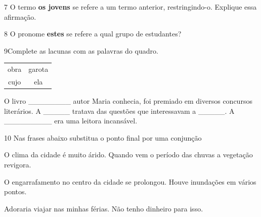 \num{7} O termo \textbf{os jovens} se refere a um termo anterior, restringindo-o. 
Explique essa afirmação.


\num{8} O pronome \textbf{estes} se refere a qual grupo de estudantes?


\num{9}Complete as lacunas com as palavras do quadro.

\begin{table}[h!]
\begin{tabular}{cc}
obra & garota \\
cujo & ela
\end{tabular}
\end{table}

O livro \_\_\_\_\_\_\_\_ autor Maria conhecia, foi premiado em diversos
concursos literários. A \_\_\_\_\_ tratava das questões que interessavam
a \_\_\_\_\_. A \_\_\_\_\_\_\_\_\_ era uma leitora incansável.


\num{10} Nas frases abaixo substitua o ponto final por uma conjunção

\begin{escolha}

  \item O clima da cidade é muito árido. Quando vem o período das chuvas a
  vegetação revigora.

\item{}
  
  \item O engarrafamento no centro da cidade se prolongou. Houve inundações em
  vários pontos.

\item{}
  
  \item Adoraria viajar nas minhas férias. Não tenho dinheiro para isso.

\item{}

\end{escolha}

